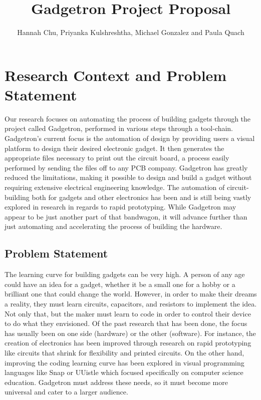 \documentclass[12pt]{article}
\begin{document}
\author{Hannah Chu, Priyanka Kulshreshtha, Michael Gonzalez and Paula Quach}
\title{Gadgetron Project Proposal}
\maketitle

\section{Research Context and Problem Statement}
Our research focuses on automating the process of building gadgets through the project called Gadgetron, performed in various steps through a tool-chain. Gadgetron's current focus is the automation of design by providing users a visual platform to design their desired electronic gadget. It then generates the appropriate files necessary to print out the circuit board, a process easily performed by sending the files off to any PCB company. Gadgetron has greatly reduced the limitations, making it possible to design and build a gadget without requiring extensive electrical engineering knowledge. The automation of circuit-building both for gadgets and other electronics has been and is still being vastly explored in research in regards to rapid prototyping. While Gadgetron may appear to be just another part of that bandwagon, it will advance further than just automating and accelerating the process of building the hardware.
\subsection{Problem Statement}
The learning curve for building gadgets can be very high. A person of any age could have an idea for a gadget, whether it be a small one for a hobby or a brilliant one that could change the world. However, in order to make their dreams a reality, they must learn circuits, capacitors, and resistors to implement the idea. Not only that, but the maker must learn to code in order to control their device to do what they envisioned. Of the past research that has been done, the focus has usually been on one side (hardware) or the other (software). For instance, the creation of electronics has been improved through research on rapid prototyping like circuits that shrink for flexibility\cite{shrinky} and printed circuits\cite{inkjets}. On the other hand, improving the coding learning curve has been explored in visual programming languages like Snap or UUistle which focused specifically on computer science education\cite{UUistle}. Gadgetron must address these needs, so it must become more universal and cater to a larger audience. \\[7pt]
\end{document}
